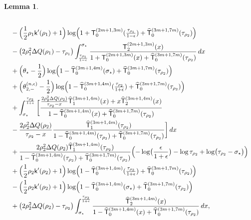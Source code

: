 \documentclass[a4paper]{article}
\newtheorem{lemma}[theorem]{Lemma}
\numberwithin{equation}{section}
\begin{document}
\begin{lemma}
\begin{align*}
\\
&\quad
-
\Bigl(\frac{1}{2}\rho_1\mathsf{k}'(\rho_1)+1\Bigr)
\log\Bigl(1+\mathsf{T}_{0}^{(2m+1,3m)}(\tfrac{\tau_{\rho_1}}{1-\epsilon})+\widehat{\mathsf{T}}_0^{(3m+1,7m)}(\tau_{\rho_2})\Bigr)
\\
&\quad 
-
\bigl(2\rho_1^2\Delta Q(\rho_1)-\tau_{\rho_1}\bigr)
\int_{\frac{\tau_{\rho_1}}{1-\epsilon}}^{\sigma_{\star}}
\frac{
\mathsf{T}_{2}^{(2m+1,3m)}(x)
}{
1+\mathsf{T}_{0}^{(2m+1,3m)}(x)+\widehat{\mathsf{T}}_0^{(3m+1,7m)}(\tau_{\rho_2})}\,dx
\\
&\quad
+
\Bigl(\theta_{\star}-\frac{1}{2}\Bigr)
\log\Bigl(1-\widehat{\mathsf{T}}_0^{(3m+1,4m)}(\sigma_{\star})+\widehat{\mathsf{T}}_0^{(3m+1,7m)}(\tau_{\rho_2})\Bigr)
\\
&\quad 
+\Bigl(\theta_{2,-}^{(n,\epsilon)}-\frac{1}{2}\Bigr)
\log\Bigl(1-\widehat{\mathsf{T}}_0^{(3m+1,4m)}(\tfrac{\tau_{\rho_2}}{1+\epsilon})+\widehat{\mathsf{T}}_0^{(3m+1,7m)}(\tau_{\rho_2})\Bigr)
\\
&\quad 
+\int_{\sigma_{\star}}^{\frac{\tau_{\rho_2}}{1+\epsilon}}
\bigg[
\frac{\frac{2\rho_2^2\Delta Q(\rho_2)}{\tau_{\rho_2}-x}
\widehat{\mathsf{T}}_{1}^{(3m+1,4m)}(x)
+x\widehat{\mathsf{T}}_{2}^{(3m+1,4m)}(x)}{1-\widehat{\mathsf{T}}_0^{(3m+1,4m)}(x)+\widehat{\mathsf{T}}_0^{(3m+1,7m)}(\tau_{\rho_2})}
\\
&\quad 
-
\frac{2\rho_2^2\Delta Q(\rho_2)}{\tau_{\rho_2}-x}
\frac{
\widehat{\mathsf{T}}_{1}^{(3m+1,4m)}(\tau_{\rho_2})
}{1-\widehat{\mathsf{T}}_0^{(3m+1,4m)}(\tau_{\rho_2})+\widehat{\mathsf{T}}_0^{(3m+1,7m)}(\tau_{\rho_2})}
\bigg]\,dx
\\
&\quad
+
\frac{2\rho_2^2\Delta Q(\rho_2)
\widehat{\mathsf{T}}_{1}^{(3m+1,4m)}(\tau_{\rho_2})
}{1-\widehat{\mathsf{T}}_0^{(3m+1,4m)}(\tau_{\rho_2})+\widehat{\mathsf{T}}_0^{(3m+1,7m)}(\tau_{\rho_2})}
\Bigl( 
-\log\bigl(\frac{\epsilon}{1+\epsilon}\bigr)
-\log\tau_{\rho_2}
+\log\bigl(\tau_{\rho_2}-\sigma_{\star}\bigr)
\Bigr)
\\
&\quad 
+\Bigl(\frac{1}{2}\rho_2\mathsf{k}'(\rho_2)+1\Bigr)
\log\Bigl(1-\widehat{\mathsf{T}}_0^{(3m+1,4m)}(\tfrac{\tau_{\rho_2}}{1+\epsilon})+\widehat{\mathsf{T}}_0^{(3m+1,7m)}(\tau_{\rho_2})\Bigr)
\\
&\quad
-\Bigl(\frac{1}{2}\rho_2\mathsf{k}'(\rho_2)+1\Bigr)\log\Bigl(1-\widehat{\mathsf{T}}_0^{(3m+1,4m)}(\sigma_{\star})+\widehat{\mathsf{T}}_0^{(3m+1,7m)}(\tau_{\rho_2})\Bigr)
\\
&\quad 
+\bigl( 
2\rho_2^2\Delta Q(\rho_2)-\tau_{\rho_2}
\bigr)
\int_{\sigma_{\star}}^{\frac{\tau_{\rho_2}}{1+\epsilon}}
\frac{\widehat{\mathsf{T}}_{2}^{(3m+1,4m)}(x)}{1-\widehat{\mathsf{T}}_0^{(3m+1,4m)}(x)+\widehat{\mathsf{T}}_0^{(3m+1,7m)}(\tau_{\rho_2})}\,dx, 

\end{align*}
\end{lemma}
\end{document}

